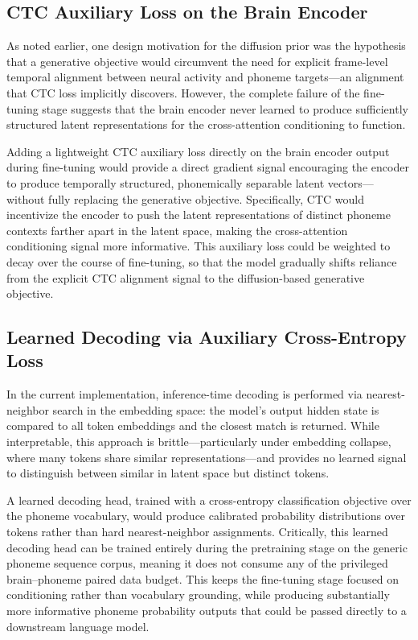 \documentclass{article}
\begin{document}
\subsection{CTC Auxiliary Loss on the Brain Encoder}

As noted earlier, one design motivation for the diffusion prior was the hypothesis that
a generative objective would circumvent the need for explicit frame-level temporal
alignment between neural activity and phoneme targets---an alignment that CTC loss
implicitly discovers. However, the complete failure of the fine-tuning stage suggests
that the brain encoder never learned to produce sufficiently structured latent
representations for the cross-attention conditioning to function.

Adding a lightweight CTC auxiliary loss directly on the brain encoder output during
fine-tuning would provide a direct gradient signal encouraging the encoder to produce
temporally structured, phonemically separable latent vectors---without fully replacing
the generative objective. Specifically, CTC would incentivize the encoder to push the
latent representations of distinct phoneme contexts farther apart in the latent space,
making the cross-attention conditioning signal more informative. This auxiliary loss
could be weighted to decay over the course of fine-tuning, so that the model gradually
shifts reliance from the explicit CTC alignment signal to the diffusion-based generative
objective.

\subsection{Learned Decoding via Auxiliary Cross-Entropy Loss}

In the current implementation, inference-time decoding is performed via nearest-neighbor
search in the embedding space: the model's output hidden state is compared to all token
embeddings and the closest match is returned. While interpretable, this approach is
brittle---particularly under embedding collapse, where many tokens share similar
representations---and provides no learned signal to distinguish between
similar in latent space but distinct tokens.

A learned decoding head, trained with a cross-entropy classification objective over
the phoneme vocabulary, would produce calibrated probability distributions over tokens
rather than hard nearest-neighbor assignments. Critically, this learned decoding head
can be trained entirely during the pretraining stage on the generic phoneme sequence
corpus, meaning it does not consume any of the privileged brain--phoneme paired data
budget. This keeps the fine-tuning stage focused on conditioning rather than vocabulary
grounding, while producing substantially more informative phoneme probability outputs
that could be passed directly to a downstream language model.
\end{document}
